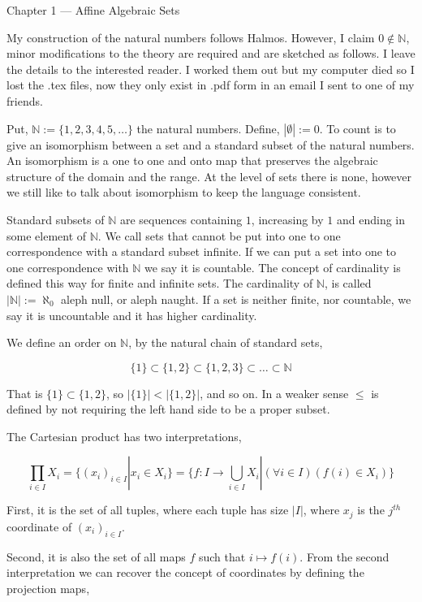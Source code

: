 \documentclass{article}
\newcommand\N{\mathbb{N}}
\begin{document}
\begin{center}
  Chapter 1 --- Affine Algebraic Sets
\end{center}\vspace{1.618em}

My construction of the natural numbers follows Halmos. However, I
claim $0 \notin \N$, minor modifications to the theory are required
and are sketched as follows. I leave the details to the interested
reader. I worked them out but my computer died so I lost the .tex
files, now they only exist in .pdf form in an email I sent to one of
my friends.

Put, $\N := \{1, 2, 3, 4, 5, \dots\}$ the natural numbers. Define, $|\emptyset| :=
0$. To count is to give an isomorphism between a set and a standard subset of the
natural numbers. An isomorphism is a one to one and onto map that
preserves the algebraic structure of the domain and the range. At the
level of sets there is none, however we still like to talk about
isomorphism to keep the language consistent.

Standard subsets of $\N$ are sequences
containing $1$, increasing by $1$ and ending in some element of
$\N$. We call sets that cannot be put into one to one correspondence
with a standard subset infinite. If we can put a set into one to one
correspondence with $\N$ we say it is countable. The concept of
cardinality is defined this way for finite and infinite sets. The
cardinality of $\N$, is called $|\N|:= \aleph_0$ aleph null, or aleph
naught. If a set is neither finite, nor countable, we say it is
uncountable and it has higher cardinality.

We define an order on $\N$, by the natural chain of standard sets,

\[\{1\} \subset \{1,2\}\subset \{1,2,3\} \subset \dots \subset \N \]

That is $\{1\} \subset \{1,2\}$, so $|\{1\}| < |\{1,2\}|$, and so
on. In a weaker sense $\leq$ is defined by not requiring the left hand
side to be a proper subset.

The Cartesian product has two interpretations,

\[\prod_{i \in I} X_i = \{(x_i)_{i \in I} | x_i\in X_i\} =
  \{f:I \rightarrow \bigcup_{i\in I} X_i | (\forall i\in I)(f(i) \in X_i)\}\]


First, it is the set of all tuples, where each tuple has size $|I|$, where
$x_j$ is the $j^{th}$ coordinate of $(x_i)_{i\in I}$.

Second, it is also the set of all maps $f$ such that $i\mapsto f(i)$. From the
second interpretation we can recover the concept of coordinates by
defining the projection maps,
\end{document}
